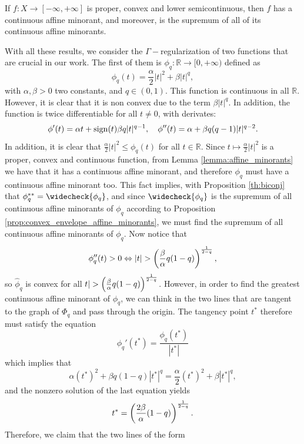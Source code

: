 \begin{lemma}\label{lemma:affine_minorants}
    If $f: X\to [-\infty, +\infty]$ is proper, convex and lower semicontinuous, then $f$ has a continuous affine minorant, and moreover, is the supremum of all of its continuous affine minorants.
\end{lemma}

With all these results, we consider the $\Gamma-$regularization of two functions that are crucial in our work. The first of them is $\phi_q: \mathbb{R}\to [0,+\infty)$ defined as
\[
\phi_q(t)= \frac{\alpha}{2}|t|^2+\beta |t|^q,
\]
with $\alpha, \beta>0$ two constants, and $q\in (0,1)$. This function is continuous in all $\mathbb{R}$. However, it is clear that it is non convex due to the term $\beta |t|^q$. In addition, the function is twice differentiable for all $t\ne 0$, with derivates:
\begin{equation}\label{eq:convexity_phiq}
\phi'(t)=\alpha t+\mathrm{sign}(t)\beta q |t|^{q-1}, \quad \phi''(t)=\alpha+\beta q(q-1)|t|^{q-2}.
\end{equation}
In addition, it is clear that $\frac{\alpha}{2}|t|^2\le \phi_q(t)$ for all $t\in\mathbb{R}$. Since $t\mapsto \frac{\alpha}{2}|t|^2$ is a proper, convex and continuous function, from Lemma \ref{lemma:affine_minorants} we have that it has a continuous affine minorant, and therefore $\phi_q$ must have a continuous affine minorant too. This fact implies, with Proposition \ref{th:biconj} that $\phi_q^{**}=\widecheck{\phi_q}$, and since $\widecheck{\phi_q}$ is the supremum of all continuous affine minorants of $\phi_q$ according to Proposition \ref{prop:convex_envelope_affine_minorants}, we must find the supremum of all continuous affine minorants of $\phi_q$. Now notice that
\[
\phi_q''(t)>0 \Leftrightarrow |t|>\l(\frac{\beta}{\alpha}q(1-q)\r)^{\frac{1}{2-q}},
\]
so $\widehat{\phi}_q$ is convex for all $t|>\l(\frac{\beta}{\alpha}q(1-q)\r)^{\frac{1}{2-q}}$. However, in order to find the greatest continuous affine minorant of $\phi_q$, we can think in the two lines that are tangent to the graph of $\Phi_q$ and pass through the origin. The tangency point $t^*$ therefore must satisfy the equation
\begin{equation}\label{eq:jump}
\phi_q'(t^*)=\frac{\phi_q(t^*)}{|t^*|}
\end{equation}
which implies that
\[
\alpha (t^*)^2+\beta q(1-q) |t^*|^q=\frac{\alpha}{2}(t^*)^2+\beta|t^*|^q,
\]
and the nonzero solution of the last equation yields
\[
t^*=\left(\frac{2\beta}{\alpha}(1-q)\right)^{\frac{1}{2-q}}.
\]
Therefore, we claim that the two lines of the form

